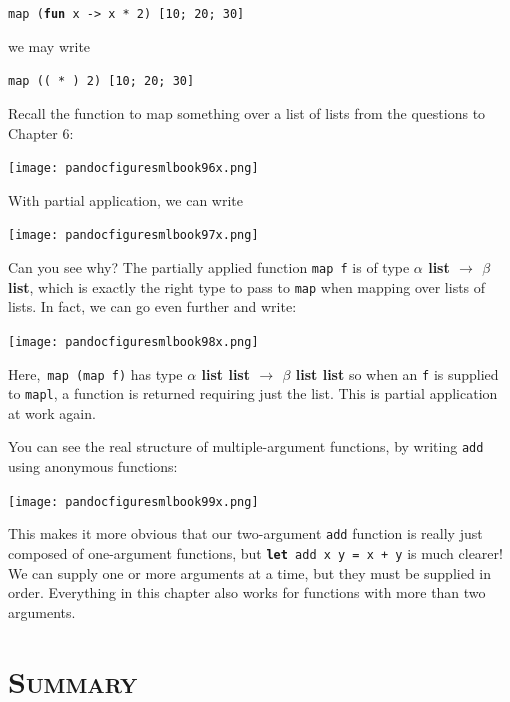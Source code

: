 \documentclass[]{book}
\newcommand{\smspace}{\vspace{4mm}}
\begin{document}
\smspace
\texttt{map (\textbf{fun} x -> x * 2) [10; 20; 30]}
\smspace

\noindent we may write

\smspace
\texttt{map (( * ) 2) [10; 20; 30]}
\smspace

\noindent Recall the function to map something over a list of lists from the questions to Chapter 6:

\medskip
\begin{center}
\noindent\texttt{[image: pandocfiguresmlbook96x.png]}
\end{center}
\medskip

\noindent With partial application, we can write

\medskip
\begin{center}
\noindent\texttt{[image: pandocfiguresmlbook97x.png]}
\end{center}
\medskip

\noindent Can you see why? The partially applied function \texttt{map f} is of type \textbf{\textsf{$\alpha$ list $\rightarrow$ $\beta$ list}}, which is exactly the right type to pass to \texttt{map} when mapping over lists of lists. In fact, we can go even further and write:

\medskip
\begin{center}
\noindent\texttt{[image: pandocfiguresmlbook98x.png]}
\end{center}
\medskip

\noindent Here,\, \texttt{map (map f)} has type \textsf{\textbf{$\alpha$ list list $\rightarrow$ $\beta$ list list}} so when an \texttt{f} is supplied to \texttt{mapl}, a function is returned requiring just the list. This is partial application at work again.

You can see the real structure of multiple-argument functions, by writing \texttt{add} using anonymous functions:

\medskip
\begin{center}
\noindent\texttt{[image: pandocfiguresmlbook99x.png]}
\end{center}
\medskip

\noindent This makes it more obvious that our two-argument \texttt{add} function is really just composed of one-argument functions, but \texttt{\textbf{let}\! add\! x\! y\! =\! x\! +\! y} is much clearer! We can supply one or more arguments at a time, but they must be supplied in order. Everything in this chapter also works for functions with more than two arguments. 

\section*{\textsc{Summary}}
\end{document}
